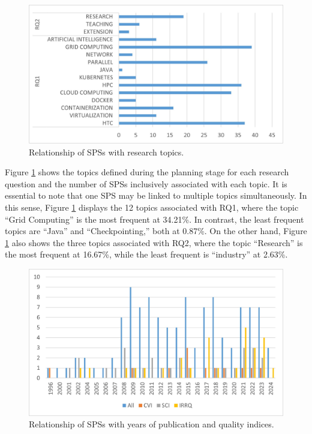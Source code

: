 \begin{figure}[htbp]
	\centering
	\vspace{10pt}
	\includegraphics[scale=0.7]{resources/figures/SPSsByTopic.jpg}
	\vspace{6pt}
	\caption{Relationship of SPSs with research topics.}
	\label{fig:SPSsByTopics}
\end{figure}

Figure \ref{fig:SPSsByTopics} shows the topics defined during the planning stage for each research question and the number of SPSs inclusively associated with each topic. It is essential to note that one SPS may be linked to multiple topics simultaneously. In this sense, Figure \ref{fig:SPSsByTopics} displays the 12 topics associated with RQ1, where the topic ``Grid Computing'' is the most frequent at 34.21\%. In contrast, the least frequent topics are ``Java'' and ``Checkpointing,'' both at 0.87\%. On the other hand, Figure \ref{fig:SPSsByTopics} also shows the three topics associated with RQ2, where the topic ``Research'' is the most frequent at 16.67\%, while the least frequent is ``industry'' at 2.63\%.

\begin{figure}[htbp]
	\centering
	\vspace{10pt}
	\includegraphics[scale=0.7]{resources/figures/SPSsBYearsAndIndexes.jpg}
	\vspace{6pt}
	\caption{Relationship of SPSs with years of publication and quality indices.}
	\label{fig:SPSsByYearsAndIndexes}
\end{figure}

